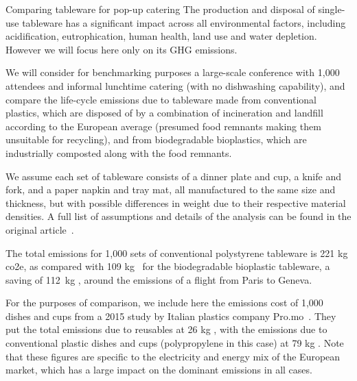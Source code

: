 \documentclass[../SustainableHEP.tex]{subfiles}
\begin{document}
\begin{casestudy}{Comparing tableware for pop-up catering}%
\noindent The production and disposal of single-use tableware has a significant impact across all environmental factors, including acidification, eutrophication, human health, land use and water depletion.  However we will focus here only on its GHG emissions.

    We will consider for benchmarking purposes a large-scale conference with 1,000 attendees and informal lunchtime catering (\ie with no dishwashing capability), and compare the life-cycle emissions due to tableware made from conventional plastics, which are disposed of by a combination of incineration and landfill according to the European average (presumed food remnants making them unsuitable for recycling), and from biodegradable bioplastics, which are industrially composted along with the food remnants.

    We assume each set of tableware consists of a dinner plate and cup, a knife and fork, and a paper napkin and tray mat, all manufactured to the same size and thickness, but with possible differences in weight due to their respective material densities.  A full list of assumptions and details of the analysis can be found in the original article~\cite{Fieschi2018}.   

    The total emissions for 1,000 sets of conventional polystyrene tableware is 221 kg \acrshort{co2e}, as compared with 109 kg \CdOe\ for the biodegradable bioplastic tableware, a saving of 112~kg \CdOe, around the emissions of a flight from Paris to Geneva.  

    For the purposes of comparison, we include here the emissions cost of 1,000 dishes and cups from a 2015 study by Italian plastics company Pro.mo~\cite{PROMO2015}.  They put the total emissions due to reusables at 26 kg \CdOe, with the emissions due to conventional plastic dishes and cups (polypropylene in this case) at 79 kg \CdOe.
Note that these figures are specific to the electricity and energy mix of the European market, which has a large impact on the dominant emissions in all cases.

\end{casestudy}
\end{document}
